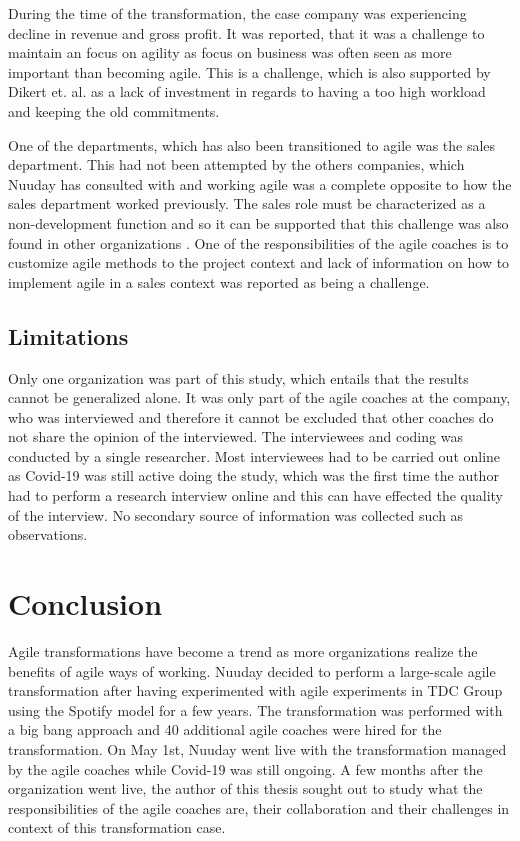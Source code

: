 \documentclass[11pt,a4paper]{report}
\begin{document}
During the time of the transformation, the case company was experiencing decline in revenue and gross profit. It was reported, that it was a challenge to maintain an focus on agility as focus on business was often seen as more important than becoming agile. This is a challenge, which is also supported by Dikert et. al. \cite{dikert2016challenges} as a lack of investment in regards to having a too high workload and keeping the old commitments. 

One of the departments, which has also been transitioned to agile was the sales department. This had not been attempted by the others companies, which Nuuday has consulted with and working agile was a complete opposite to how the sales department worked previously. The sales role must be characterized as a non-development function and so it can be supported that this challenge was also found in other organizations \cite{dikert2016challenges}. One of the responsibilities of the agile coaches is to customize agile methods to the project context \cite{stray2020agile} and lack of information on how to implement agile in a sales context was reported as being a challenge.

\section{Limitations}
Only one organization was part of this study, which entails that the results cannot be generalized alone. It was only part of the agile coaches at the company, who was interviewed and therefore it cannot be excluded that other coaches do not share the opinion of the interviewed. The interviewees and coding was conducted by a single researcher. Most interviewees had to be carried out online as Covid-19 was still active doing the study, which was the first time the author had to perform a research interview online and this can have effected the quality of the interview. No secondary source of information was collected such as observations.

\chapter{Conclusion}
Agile transformations have become a trend as more organizations realize the benefits of agile ways of working. Nuuday decided to perform a large-scale agile transformation after having experimented with agile experiments in TDC Group using the Spotify model for a few years. The transformation was performed with a big bang approach and 40 additional agile coaches were hired for the transformation. On May 1st, Nuuday went live with the transformation managed by the agile coaches while Covid-19 was still ongoing. A few months after the organization went live, the author of this thesis sought out to study what the responsibilities of the agile coaches are, their collaboration and their challenges in context of this transformation case.
\end{document}
